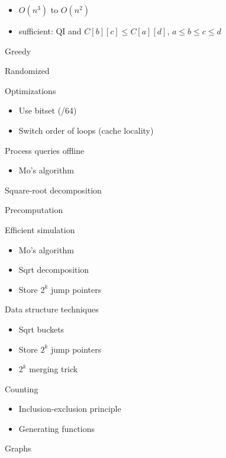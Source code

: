 \begin{myitemize}
\begin{itemize}
\begin{itemize}
\begin{itemize}
                    \item $O(n^3)$ to $O(n^2)$
                    \item sufficient: QI and $C[b][c] \leq C[a][d]$, $a\leq b\leq c\leq d$
                  \end{itemize}
              \end{itemize}
        \end{itemize}
      \item Greedy
      \item Randomized
      \item Optimizations
        \begin{itemize}
          \item Use bitset (/64)
          \item Switch order of loops (cache locality)
        \end{itemize}
      \item Process queries offline
        \begin{itemize}
          \item Mo's algorithm
        \end{itemize}
      \item Square-root decomposition
      \item Precomputation
      \item Efficient simulation
        \begin{itemize}
          \item Mo's algorithm
          \item Sqrt decomposition
          \item Store $2^k$ jump pointers
        \end{itemize}
      \item Data structure techniques
        \begin{itemize}
          \item Sqrt buckets
          \item Store $2^k$ jump pointers
          \item $2^k$ merging trick
        \end{itemize}
      \item Counting
        \begin{itemize}
          \item Inclusion-exclusion principle
          \item Generating functions
        \end{itemize}
      \item Graphs
        \begin{itemize}

\end{itemize}
\end{myitemize}
